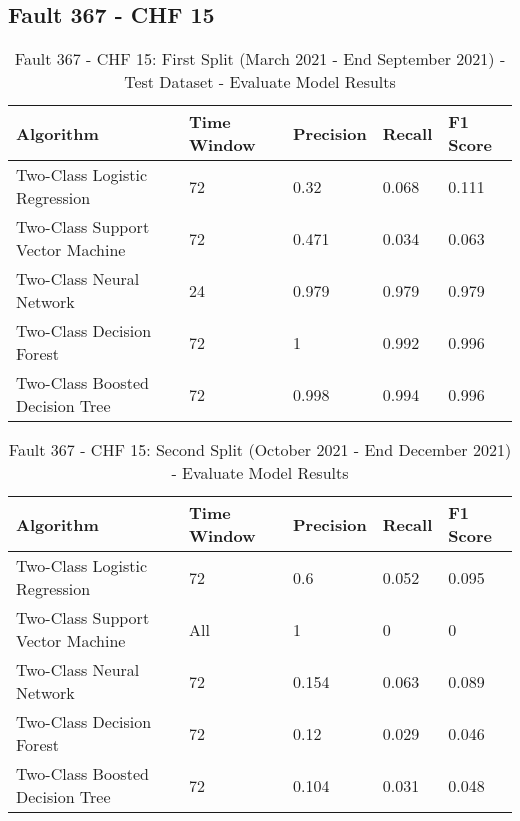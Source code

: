 \subsection{Fault 367 - CHF 15}

\begin{table}[!ht]
    \centering
    \begin{tabular}{|l|l|l|l|l|}
    \hline
        Algorithm & Time Window & Precision & Recall & F1 Score \\ \hline
        Two-Class Logistic Regression & 72 & 0.32 & 0.068 & 0.111 \\ \hline
        Two-Class Support Vector Machine & 72 & 0.471 & 0.034 & 0.063 \\ \hline
        Two-Class Neural Network & 24 & 0.979 & 0.979 & 0.979 \\ \hline
        Two-Class Decision Forest & 72 & 1 & 0.992 & 0.996 \\ \hline
        Two-Class Boosted Decision Tree & 72 & 0.998 & 0.994 & 0.996 \\ \hline
    \end{tabular}
    \caption{Fault 367 - CHF 15: First Split (March 2021 - End September 2021) - Test Dataset - Evaluate Model Results}
    \label{9112_SCA34_1st}
\end{table}

\begin{table}[!ht]
    \centering
    \begin{tabular}{|l|l|l|l|l|}
    \hline
        Algorithm & Time Window & Precision & Recall & F1 Score \\ \hline
        Two-Class Logistic Regression & 72 & 0.6 & 0.052 & 0.095 \\ \hline
        Two-Class Support Vector Machine & All & 1 & 0 & 0 \\ \hline
        Two-Class Neural Network & 72 & 0.154 & 0.063 & 0.089 \\ \hline
        Two-Class Decision Forest & 72 & 0.12 & 0.029 & 0.046 \\ \hline
        Two-Class Boosted Decision Tree & 72 & 0.104 & 0.031 & 0.048 \\ \hline
    \end{tabular}
    \caption{Fault 367 - CHF 15: Second Split (October 2021 - End December 2021) - Evaluate Model Results}
    \label{9112_SCA34_1st}
\end{table}

